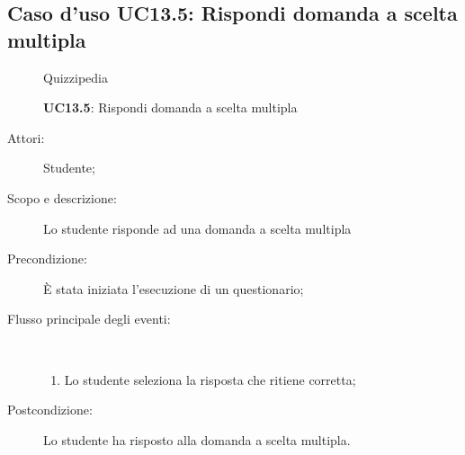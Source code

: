 \subsection{Caso d'uso UC13.5: Rispondi domanda a scelta multipla}
	\begin{figure}[H]
		\centering
		\begin{resizedtikzpicture}{\textwidth}
		\begin{umlsystem}[x=0, fill=lightgray!20]{Quizzipedia}
		\end{umlsystem}
		\end{resizedtikzpicture}
		\caption{\textbf{UC13.5}: Rispondi domanda a scelta multipla}
		\label{UC13.5}
	\end{figure}
\begin{description}
\item[Attori:] Studente;
\item[Scopo e descrizione:] Lo studente risponde ad una domanda a scelta multipla
      \item[Precondizione:] È stata iniziata l'esecuzione di un questionario;

        \item[Flusso principale degli eventi:] \ 
 \begin{enumerate}
          \item Lo studente seleziona la risposta che ritiene corretta;

      \end{enumerate}
    \item[Postcondizione:] Lo studente ha risposto alla domanda a scelta multipla.
  \end{description}
\hypertarget{UC13.6}{}
